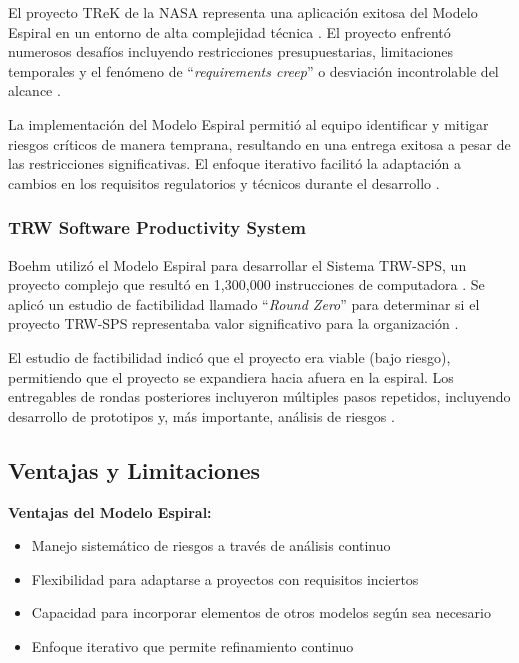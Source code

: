 \documentclass[conference]{IEEEtran}
\begin{document}
El proyecto TReK de la NASA representa una aplicación exitosa del Modelo Espiral en un entorno de alta complejidad técnica \cite{nasa_trek_2002}. El proyecto enfrentó numerosos desafíos incluyendo restricciones presupuestarias, limitaciones temporales y el fenómeno de ``\textit{requirements creep}'' o desviación incontrolable del alcance \cite{nasa_trek_2002}.

La implementación del Modelo Espiral permitió al equipo identificar y mitigar riesgos críticos de manera temprana, resultando en una entrega exitosa a pesar de las restricciones significativas. El enfoque iterativo facilitó la adaptación a cambios en los requisitos regulatorios y técnicos durante el desarrollo \cite{nasa_trek_2002}.

\subsubsection{TRW Software Productivity System}

Boehm utilizó el Modelo Espiral para desarrollar el Sistema TRW-SPS, un proyecto complejo que resultó en 1,300,000 instrucciones de computadora \cite{sciencedirect_spiral}. Se aplicó un estudio de factibilidad llamado ``\textit{Round Zero}'' para determinar si el proyecto TRW-SPS representaba valor significativo para la organización \cite{sciencedirect_spiral}.

El estudio de factibilidad indicó que el proyecto era viable (bajo riesgo), permitiendo que el proyecto se expandiera hacia afuera en la espiral. Los entregables de rondas posteriores incluyeron múltiples pasos repetidos, incluyendo desarrollo de prototipos y, más importante, análisis de riesgos \cite{sciencedirect_spiral}.

\subsection{Ventajas y Limitaciones}

\textbf{Ventajas del Modelo Espiral:}
\begin{itemize}
\item Manejo sistemático de riesgos a través de análisis continuo \cite{geeksforgeeks_spiral}
\item Flexibilidad para adaptarse a proyectos con requisitos inciertos \cite{boehm1988spiral}
\item Capacidad para incorporar elementos de otros modelos según sea necesario \cite{semantic_scholar_spiral}
\item Enfoque iterativo que permite refinamiento continuo \cite{teaching_agile_spiral}
\end{itemize}
\end{document}
